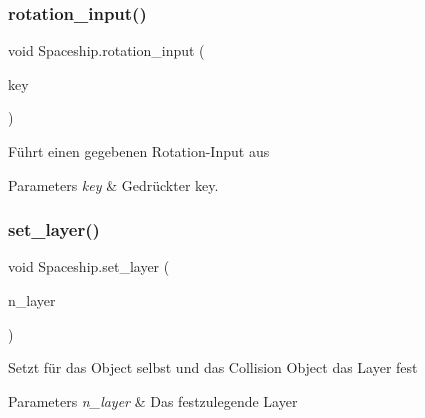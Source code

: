 \mbox{\label{class_spaceship_accc7fe7a6f5df4f43fa8b3ab7469c3c7}} 
\subsubsection{\texorpdfstring{rotation\+\_\+input()}{rotation\_input()}}
{\footnotesize\ttfamily void Spaceship.\+rotation\+\_\+input (\begin{DoxyParamCaption}\item[{Movement\+Input\+Keys}]{key }\end{DoxyParamCaption})}



Führt einen gegebenen Rotation-\/\+Input aus 


\begin{DoxyParams}{Parameters}
{\em key} & Gedrückter key.\\
\hline
\end{DoxyParams}
\mbox{\label{class_spaceship_a627ae269cfe0db00d361c9e4a8ce2413}} 
\subsubsection{\texorpdfstring{set\+\_\+layer()}{set\_layer()}}
{\footnotesize\ttfamily void Spaceship.\+set\+\_\+layer (\begin{DoxyParamCaption}\item[{int}]{n\+\_\+layer }\end{DoxyParamCaption})}



Setzt für das Object selbst und das Collision Object das Layer fest 


\begin{DoxyParams}{Parameters}
{\em n\+\_\+layer} & Das festzulegende Layer\\
\hline
\end{DoxyParams}
\mbox{\label{class_spaceship_ade12946ccbbfffb92a864b710dc2217d}} 
